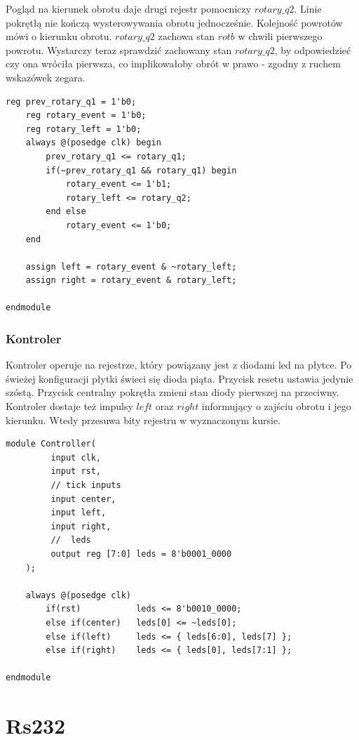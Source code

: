 \documentclass[a4paper,12pt]{article}
\begin{document}
Pogląd na kierunek obrotu daje drugi rejestr pomocniczy $rotary\_q2$. Linie pokrętłą nie kończą wysterowywania obrotu jednocześnie. Kolejność powrotów mówi o kierunku obrotu. $rotary\_q2$ zachowa stan $rotb$ w chwili pierwszego powrotu. Wystarczy teraz sprawdzić zachowany stan $rotary\_q2$, by odpowiedzieć czy ona wróciła pierwsza, co implikowałoby obrót w prawo - zgodny z ruchem wskazówek zegara.
\begin{lstlisting}[label=Rotor,caption=Rotor.v,firstnumber=22]
    reg prev_rotary_q1 = 1'b0;
    reg rotary_event = 1'b0;
    reg rotary_left = 1'b0;
    always @(posedge clk) begin
        prev_rotary_q1 <= rotary_q1;
        if(~prev_rotary_q1 && rotary_q1) begin
            rotary_event <= 1'b1;
            rotary_left <= rotary_q2;
        end else
            rotary_event <= 1'b0;
    end

    assign left = rotary_event & ~rotary_left;
    assign right = rotary_event & rotary_left;

endmodule
\end{lstlisting}

\subsubsection{Kontroler}

Kontroler operuje na rejestrze, który powiązany jest z diodami led na płytce. Po świeżej konfiguracji płytki świeci się dioda piąta. Przycisk resetu ustawia jedynie szóstą. Przycisk centralny pokrętła zmieni stan diody pierwszej na przeciwny. Kontroler dostaje też impulsy $left$ oraz $right$ informujący o zajściu obrotu i jego kierunku. Wtedy przesuwa bity rejestru w wyznaczonym kursie.
\begin{lstlisting}[label=Controller,caption=Controller.v]
module Controller(
         input clk,
         input rst,
         // tick inputs
         input center,
         input left,
         input right,
         //  leds
         output reg [7:0] leds = 8'b0001_0000
    );

    always @(posedge clk)
        if(rst)           leds <= 8'b0010_0000;
        else if(center)   leds[0] <= ~leds[0];
        else if(left)     leds <= { leds[6:0], leds[7] };
        else if(right)    leds <= { leds[0], leds[7:1] };

endmodule
\end{lstlisting}


\newpage
\section{Rs232}
\end{document}
